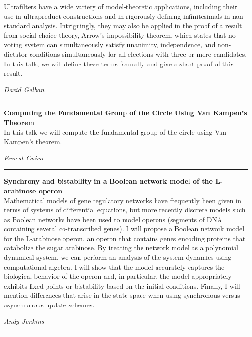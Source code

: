 \documentclass[oneside]{amsart}
\begin{document}
Ultrafilters have a wide variety of model-theoretic applications, including their use in ultraproduct constructions and in rigorously defining infinitesimals in non-standard analysis.  Intriguingly, they may also be applied in the proof of a result from social choice theory, Arrow's impossibility theorem, which states that no voting system can simultaneously satisfy unanimity, independence, and non-dictator conditions simultaneously for all elections with three or more candidates.  In this talk, we will define these terms formally and give a short proof of this result. \vspace{-1em}\\
\begin{flushright} \textit{ David Galban } \vspace{0.5em} \end{flushright}
\rule{\textwidth}{0.4pt}
\vspace{0.5em}

\filbreak
\hspace{-20pt}\textbf{ \textbf{ Computing the Fundamental Group of the Circle Using Van Kampen's Theorem } } \vspace{0.5em}\\
In this talk we will compute the fundamental group of the circle using Van Kampen's theorem. \vspace{-1em}\\
\begin{flushright} \textit{ Ernest Guico } \vspace{0.5em} \end{flushright}
\rule{\textwidth}{0.4pt}
\vspace{0.5em}

\filbreak
\hspace{-20pt}\textbf{ \textbf{ Synchrony and bistability in a Boolean network model of the L-arabinose operon } } \vspace{0.5em}\\
Mathematical models of gene regulatory networks have frequently been given in terms of systems of differential equations, but more recently discrete models such as Boolean networks have been used to model operons (segments of DNA containing several co-transcribed genes).  I will propose a Boolean network model for the L-arabinose operon, an operon that contains genes encoding proteins that catabolize the sugar arabinose.  By treating the network model as a polynomial dynamical system, we can perform an analysis of the system dynamics using computational algebra.  I will show that the model accurately captures the biological behavior of the operon and, in particular, the model appropriately exhibits fixed points or bistability based on the initial conditions.  Finally, I will mention differences that arise in the state space when using synchronous versus asynchronous update schemes. \vspace{-1em}\\
\begin{flushright} \textit{ Andy Jenkins } \vspace{0.5em} \end{flushright}
\rule{\textwidth}{0.4pt}
\vspace{0.5em}
\end{document}
